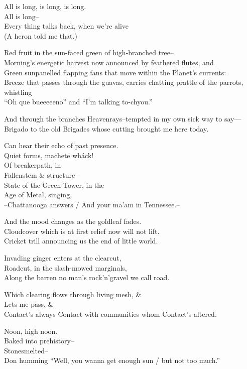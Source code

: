 All is long, is long, is long. \\
All is long-- \\

Every thing talks back, when we're alive \\
(A heron told me that.)

Red fruit in the sun-faced green of high-branched tree-- \\
Morning's energetic harvest now announced by feathered flutes, and \\
Green sunpanelled flapping fans that move within the Planet's currents: \\
Breeze that passes through the guavas, carries chatting prattle of the parrots, whistling \\
“Oh que bueeeeeno” and “I'm talking to-chyou.”

And through the branches Heavenrays--tempted in my own sick way to say— \\
Brigado to the old Brigades whose cutting brought me here today. 

Can hear their echo of past presence. \\
Quiet forms, machete wháck! \\
Of breakerpath, in \\
Fallenstem \& structure-- \\
State of the Green Tower, in the \\
Age of Metal, singing, \\
--Chattanooga answers / And your ma'am in Tennessee.-- 

And the mood changes as the goldleaf fades. \\
Cloudcover which is at first relief now will not lift. \\
Cricket trill announcing us the end of little world.

Invading ginger enters at the clearcut, \\
Roadcut, in the slash-mowed marginals, \\
Along the barren no man's rock'n'gravel we call road. 

Which clearing flows through living mesh, \& \\
Lets me pass, \& \\
Contact's always Contact with communities whom Contact's altered.

\secdiv

Noon, high noon. \\
Baked into prehistory-- \\
Stonesmelted--\\ 
Don humming “Well, you wanna get enough sun / but not too much.” 

